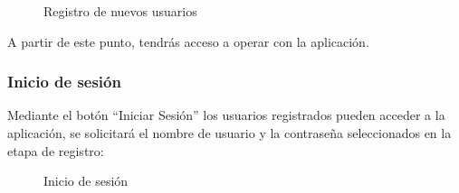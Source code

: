 \begin{figure} [!htb]
	\centering
	\caption{Registro de nuevos usuarios}
	\label{fig:registroUsuarios}
\end{figure}

A partir de este punto, tendrás acceso a operar con la aplicación.

\FloatBarrier
\subsubsection{Inicio de sesión}

Mediante el botón ``Iniciar Sesión'' los usuarios registrados pueden acceder a la aplicación, se solicitará el nombre de usuario y la contraseña seleccionados en la etapa de registro:

\begin{figure} [!htb]
	\centering
	\caption{Inicio de sesión}
	\label{fig:inicioSesion}
\end{figure}

